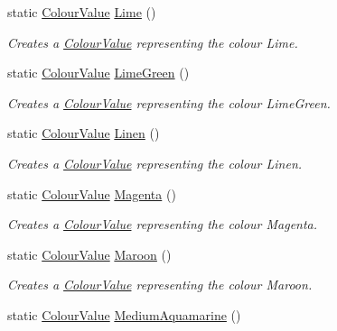\begin{DoxyCompactItemize}
static \hyperlink{classMezzanine_1_1ColourValue}{ColourValue} \hyperlink{classMezzanine_1_1ColourValue_a58b01f925fbdd48fa260c55eec11d1a1}{Lime} ()
\begin{DoxyCompactList}\small\item\em Creates a \hyperlink{classMezzanine_1_1ColourValue}{ColourValue} representing the colour Lime. \item\end{DoxyCompactList}\item 
static \hyperlink{classMezzanine_1_1ColourValue}{ColourValue} \hyperlink{classMezzanine_1_1ColourValue_ae2ece72ba159acaee064b8b86955c8ed}{LimeGreen} ()
\begin{DoxyCompactList}\small\item\em Creates a \hyperlink{classMezzanine_1_1ColourValue}{ColourValue} representing the colour LimeGreen. \item\end{DoxyCompactList}\item 
static \hyperlink{classMezzanine_1_1ColourValue}{ColourValue} \hyperlink{classMezzanine_1_1ColourValue_aba3b82db7c889f06d5126fa7808374fc}{Linen} ()
\begin{DoxyCompactList}\small\item\em Creates a \hyperlink{classMezzanine_1_1ColourValue}{ColourValue} representing the colour Linen. \item\end{DoxyCompactList}\item 
static \hyperlink{classMezzanine_1_1ColourValue}{ColourValue} \hyperlink{classMezzanine_1_1ColourValue_a4ce7bff5fbca271d3b83664098dcddb3}{Magenta} ()
\begin{DoxyCompactList}\small\item\em Creates a \hyperlink{classMezzanine_1_1ColourValue}{ColourValue} representing the colour Magenta. \item\end{DoxyCompactList}\item 
static \hyperlink{classMezzanine_1_1ColourValue}{ColourValue} \hyperlink{classMezzanine_1_1ColourValue_a265fec4dd95074e9436c1b8d131f22ea}{Maroon} ()
\begin{DoxyCompactList}\small\item\em Creates a \hyperlink{classMezzanine_1_1ColourValue}{ColourValue} representing the colour Maroon. \item\end{DoxyCompactList}\item 
static \hyperlink{classMezzanine_1_1ColourValue}{ColourValue} \hyperlink{classMezzanine_1_1ColourValue_a75684d5078e2b0869391ce0eeb6dd725}{MediumAquamarine} ()

\end{DoxyCompactItemize}

